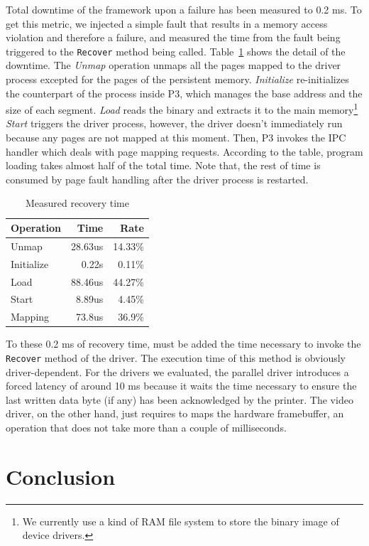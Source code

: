 \documentclass{acm_proc_article-sp}
\begin{document}
Total downtime of the framework upon a failure has been measured to 0.2 ms.  To get this metric, we injected a simple fault that results in a memory access violation and therefore a failure, and measured the time from the fault being triggered to the {\tt Recover} method being called.  Table~\ref{tbl:recovery} shows the detail of the downtime.  The {\it Unmap} operation unmaps all the pages mapped to the driver process excepted for the pages of the persistent memory.  {\it Initialize} re-initializes the counterpart of the process inside P3, which manages the base address and the size of each segment.  {\it Load} reads the binary and extracts it to the main memory\footnote{We currently use a kind of RAM file system to store the binary image of device drivers.}  {\it Start} triggers the driver process, however, the driver doesn't immediately run because any pages are not mapped at this moment.  Then, P3 invokes the IPC handler which deals with page mapping requests.  According to the table, program loading takes almost half of the total time.  Note that, the rest of time is consumed by page fault handling after the driver process is restarted.

\begin{table}[ht]
\centering
\caption{Measured recovery time}
\label{tbl:recovery}
\begin{tabular}{|l|r|r|} \hline
{\bf Operation}&{\bf Time}&{\bf Rate}\\ \hline
Unmap & 28.63us & 14.33\% \\ \hline
Initialize & 0.22s & 0.11\% \\ \hline
Load & 88.46us & 44.27\% \\ \hline
Start &  8.89us & 4.45\% \\ \hline
Mapping & 73.8us & 36.9\%\\ \hline
\end{tabular}
\end{table}

To these 0.2 ms of recovery time, must be added the time necessary to invoke the \texttt{Recover} method of the driver. The execution time of this method is obviously driver-dependent. For the drivers we evaluated, the parallel driver introduces a forced latency of around 10 ms because it waits the time necessary to ensure the last written data byte (if any) has been acknowledged by the printer. The video driver, on the other hand, just requires to maps the hardware framebuffer, an operation that does not take more than a couple of milliseconds.
\section{Conclusion}
\label{s:sum}
\end{document}
